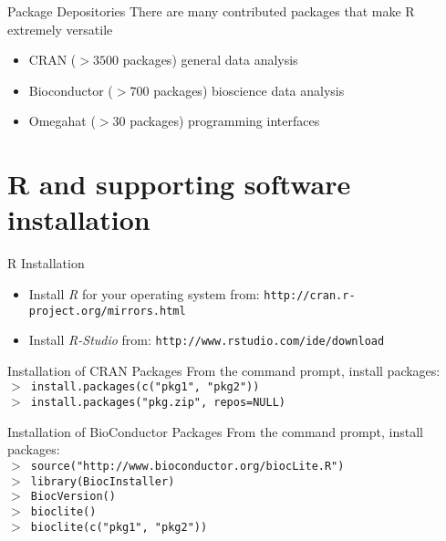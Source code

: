 \documentclass{beamer}
\begin{document}
\begin{frame}{Package Depositories}
There are many contributed packages that make R extremely versatile
\begin{itemize}
\item CRAN ($>3500$ packages) general data analysis 
\item Bioconductor ($>700$ packages) bioscience data analysis 
\item Omegahat ($>30$ packages) programming interfaces
\end{itemize} 
\end{frame}

\section[]{R and supporting software installation}
\begin{frame}{R Installation}
\begin{itemize}
\item Install \emph{R} for your operating system from: \texttt{http://cran.r-project.org/mirrors.html} 
\item Install \emph{R-Studio} from: \texttt{http://www.rstudio.com/ide/download} 
\end{itemize}
\end{frame}

\begin{frame}{Installation of CRAN Packages}
From the command prompt, install packages:\\
\texttt{$>$ install.packages(c("pkg1", "pkg2"))}\\
\texttt{$>$ install.packages("pkg.zip", repos=NULL)}
\end{frame}

\begin{frame}{Installation of BioConductor Packages}
From the command prompt, install packages:\\
\texttt{$>$ source("http://www.bioconductor.org/biocLite.R")}\\
\texttt{$>$ library(BiocInstaller)}\\
\texttt{$>$ BiocVersion()}\\
\texttt{$>$ bioclite()}\\
\texttt{$>$ bioclite(c("pkg1", "pkg2"))}
\end{frame}
\end{document}
